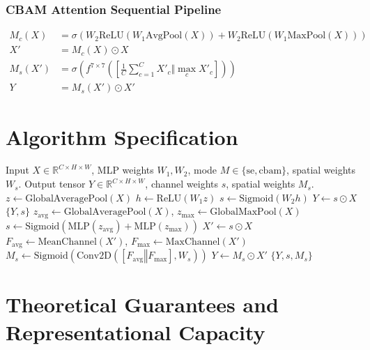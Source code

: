 \documentclass[11pt,a4paper]{article}
\theoremstyle{definition}
\begin{document}
\subsubsection{CBAM Attention Sequential Pipeline}
\begin{align}
M_c(X) &= \sigma\left( W_2 \text{ReLU}(W_1 \text{AvgPool}(X)) + W_2 \text{ReLU}(W_1 \text{MaxPool}(X)) \right) \\
X' &= M_c(X) \odot X \\
M_s(X') &= \sigma\left( f^{7 \times 7}\left( \left[ \frac{1}{C}\sum_{c=1}^C X'_c \mathbin{\Big\Vert} \max_c X'_c \right] \right) \right) \\
Y &= M_s(X') \odot X'
\end{align}

\section{Algorithm Specification}

\begin{algorithm}[H]
\caption{Squeeze-and-Excitation and CBAM Recalibration Pass}
\label{alg:se_cbam}
\begin{algorithmic}[1]
\Require Input $X \in \mathbb{R}^{C \times H \times W}$, MLP weights $W_1, W_2$, mode $M \in \{\text{se}, \text{cbam}\}$, spatial weights $W_s$.
\Ensure Output tensor $Y \in \mathbb{R}^{C \times H \times W}$, channel weights $s$, spatial weights $M_s$.
    \State $z \gets \text{GlobalAveragePool}(X)$
    \State $h \gets \text{ReLU}(W_1 z)$
    \State $s \gets \text{Sigmoid}(W_2 h)$
    \State $Y \gets s \odot X$
    \State \Return $\{Y, s\}$
\Else
    \State $z_{\text{avg}} \gets \text{GlobalAveragePool}(X)$, $z_{\text{max}} \gets \text{GlobalMaxPool}(X)$
    \State $s \gets \text{Sigmoid}(\text{MLP}(z_{\text{avg}}) + \text{MLP}(z_{\text{max}}))$
    \State $X' \gets s \odot X$
    \State $F_{\text{avg}} \gets \text{MeanChannel}(X')$, $F_{\text{max}} \gets \text{MaxChannel}(X')$
    \State $M_s \gets \text{Sigmoid}(\text{Conv2D}([F_{\text{avg}} \mathbin{\Vert} F_{\text{max}}], W_s))$
    \State $Y \gets M_s \odot X'$
    \State \Return $\{Y, s, M_s\}$
\EndIf
\end{algorithmic}
\end{algorithm}

\section{Theoretical Guarantees and Representational Capacity}
\end{document}

